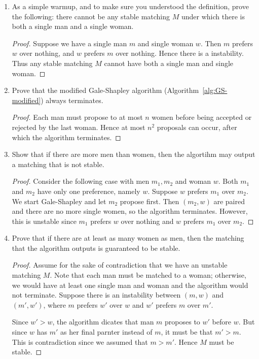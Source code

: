 \documentclass[10pt]{article}
\begin{document}
\begin{enumerate}
\item As a simple warmup, and to make sure you understood the definition, prove the following: there cannot be any stable matching $M$ under which there is both a single man and a single woman.

\begin{proof}
  Suppose we have a single man \(m\) and single woman \(w\). Then \(m\) prefers \(w\) over nothing, and \(w\) prefers \(m\) over nothing. Hence there is a instability. Thus any stable matching \(M\) cannot have both a single man and single woman. 
\end{proof}

\item Prove that the modified Gale-Shapley algorithm (Algorithm~\ref{alg:GS-modified}) always terminates.

\begin{proof}
  Each man must propose to at most \(n\) women before being accepted or rejected by the last woman. Hence at most \(n^2\) proposals can occur, after which the algorithm terminates. 
\end{proof}
  
\item Show that if there are more men than women, then the algortihm may output a matching that is not stable.

\begin{proof}
  Consider the following case with men \(m_1, m_2\) and woman \(w\). Both \(m_1\) and \(m_2\) have only one preference, namely \(w\). Suppose \(w\) prefers \(m_1\) over \(m_2\). We start Gale-Shapley and let \(m_2\) propose first. Then \((m_2, w)\) are paired and there are no more single women, so the algorithm terminates. However, this is unstable since \(m_1\) prefers \(w\) over nothing and \(w\) prefers \(m_1\) over \(m_2\).
\end{proof}

\item Prove that if there are at least as many women as men, then the matching that the algorithm outputs is guaranteed to be stable.

\begin{proof}
  Assume for the sake of contradiction that we have an unstable matching \(M\). Note that each man must be matched to a woman; otherwise, we would have at least one single man and woman and the algorithm would not terminate. Suppose there is an instability between \((m, w)\) and \((m', w')\), where \(m\) prefers \(w'\) over \(w\) and \(w'\) prefers \(m\) over \(m'\). 

  Since \(w' > w\), the algorithm dicates that man \(m\) proposes to \(w'\) before \(w\). But since \(w\) has \(m'\) as her final parnter instead of \(m\), it must be that \(m' > m\). This is contradiction since we assumed that \(m > m'\). Hence \(M\) must be stable. 
\end{proof}

\end{enumerate}
\end{document}
